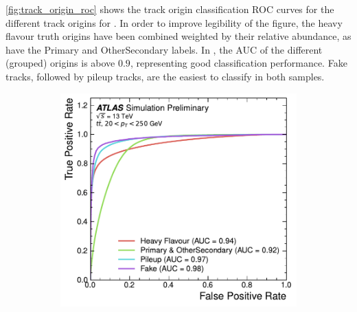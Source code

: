 \cref{fig:track_origin_roc} shows the track origin classification ROC curves for the different track origins for \ttbarZprimejets.
In order to improve legibility of the figure, the heavy flavour truth origins have been combined weighted by their relative abundance, as have the Primary and OtherSecondary labels.
In \ttbarZprimejets, the AUC of the different (grouped) origins is above $0.9$, representing good classification performance.
Fake tracks, followed by pileup tracks, are the easiest to classify in both samples.

\begin{figure}[!htbp]
    \centering
    \begin{subfigure}[b]{0.48\textwidth}
        \centering
        \includegraphics[width=\textwidth]{chapters/gnn_tagger/figs/results/tracks/ttbar/ttbar_origin_roc_GNNv11.pdf}
    \end{subfigure}
    \quad
    \begin{subfigure}[b]{0.48\textwidth}
        \centering

\end{subfigure}
\end{figure}
